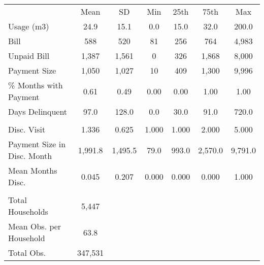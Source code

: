 \begin{tabu}{lcccccc}
 & Mean & SD & Min & 25th & 75th & Max \\ 
 Usage (m3)  & 24.9  & 15.1  & 0.0  & 15.0  & 32.0  & 200.0  \\ 
 Bill  & 588  & 520  & 81  & 256  & 764  & 4,983  \\ 
 Unpaid Bill  & 1,387  & 1,561  & 0  & 326  & 1,868  & 8,000  \\ 
 Payment Size  & 1,050  & 1,027  & 10  & 409  & 1,300  & 9,996  \\ 
 \% Months with Payment  & 0.61  & 0.49  & 0.00  & 0.00  & 1.00  & 1.00  \\ 
 Days Delinquent  & 97.0  & 128.0  & 0.0  & 30.0  & 91.0  & 720.0  \\ 
 &  &  &  &  &  &  \\ 
 Disc. Visit  & 1.336  & 0.625  & 1.000  & 1.000  & 2.000  & 5.000  \\ 
 Payment Size in Disc. Month  & 1,991.8  & 1,495.5  & 79.0  & 993.0  & 2,570.0  & 9,791.0  \\ 
 Mean Months Disc.  & 0.045  & 0.207  & 0.000  & 0.000  & 0.000  & 1.000  \\ 
 &  &  &  &  &  &  \\ 
 Total Households  & 5,447  &  &  &  &  &  \\ 
 Mean Obs. per Household  & 63.8  &  &  &  &  &  \\ 
 Total Obs.  & 347,531  &  &  &  &  &  \\ 
\end{tabu}
